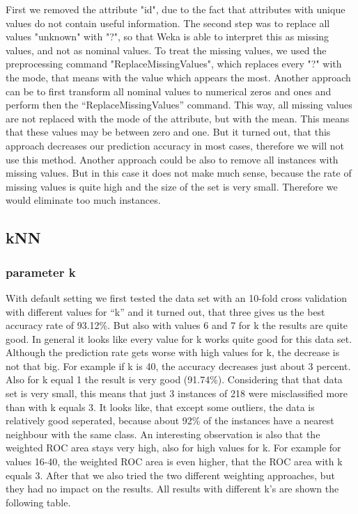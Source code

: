 \documentclass{article}
\begin{document}
First we removed the attribute "id", due to the fact that attributes with unique values do not contain useful information. The second step was to replace all values "unknown" with "?", so that Weka is able to interpret this as missing values, and not as nominal values. To treat the missing values, we used the preprocessing command "ReplaceMissingValues", which replaces every "?" with the mode, that means with the value which appears the most.
Another approach can be to first transform all nominal values to numerical zeros and ones and perform then the “ReplaceMissingValues” command. This way, all missing values are not replaced with the mode of the attribute, but with the mean. This means that these values may be between zero and one. But it turned out, that this approach decreases our prediction accuracy in most cases, therefore we will not use this method.
Another approach could be also to remove all instances with missing values. But in this case it does not make much sense, because the rate of missing values is quite high and the size of the set is very small. Therefore we would eliminate too much instances. 
 

\subsection{kNN}
 

\subsubsection{parameter k}
 
With default setting we first tested the data set with an 10-fold cross validation with different values for “k” and it turned out, that three gives us the best accuracy rate of 93.12\%. But also with values 6 and 7 for k the results are quite good. In general it looks like every value for k works quite good for this data set. Although the prediction rate gets worse with high values for k, the decrease is not that big. For example if k is 40, the accuracy decreases just about 3 percent. Also for k equal 1 the result is very good (91.74\%). Considering that that data set is very small, this means that just 3 instances of 218 were misclassified more than with k equals 3. It looks like, that except some outliers, the data is relatively good seperated, because about 92\% of the instances have a nearest neighbour with the same class. An interesting observation is also that the weighted ROC area stays very high, also for high values for k. For example for values 16-40, the weighted ROC area is even higher, that the ROC area with k equals 3. After that we also tried the two different weighting approaches, but they had no impact on the results. All results with different k's are shown the following table.
 
\end{document}
